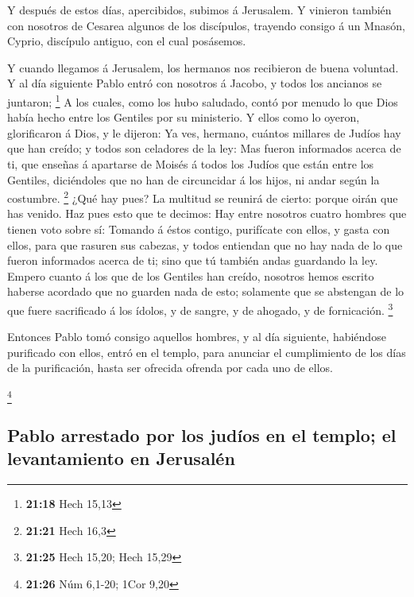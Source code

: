  Y después de estos días, apercibidos, subimos á Jerusalem.
 Y vinieron también con nosotros de Cesarea algunos de los
discípulos, trayendo consigo á un Mnasón, Cyprio, discípulo antiguo, con
el cual posásemos.

 Y cuando llegamos á Jerusalem, los hermanos nos recibieron
de buena voluntad.  Y al día siguiente Pablo entró con
nosotros á Jacobo, y todos los ancianos se juntaron; \footnote{\textbf{21:18}
  Hech 15,13}  A los cuales, como los hubo saludado, contó
por menudo lo que Dios había hecho entre los Gentiles por su ministerio.
 Y ellos como lo oyeron, glorificaron á Dios, y le dijeron:
Ya ves, hermano, cuántos millares de Judíos hay que han creído; y todos
son celadores de la ley:  Mas fueron informados acerca de
ti, que enseñas á apartarse de Moisés á todos los Judíos que están entre
los Gentiles, diciéndoles que no han de circuncidar á los hijos, ni
andar según la costumbre. \footnote{\textbf{21:21} Hech 16,3}
 ¿Qué hay pues? La multitud se reunirá de cierto: porque
oirán que has venido.  Haz pues esto que te decimos: Hay
entre nosotros cuatro hombres que tienen voto sobre sí: 
Tomando á éstos contigo, purifícate con ellos, y gasta con ellos, para
que rasuren sus cabezas, y todos entiendan que no hay nada de lo que
fueron informados acerca de ti; sino que tú también andas guardando la
ley.  Empero cuanto á los que de los Gentiles han creído,
nosotros hemos escrito haberse acordado que no guarden nada de esto;
solamente que se abstengan de lo que fuere sacrificado á los ídolos, y
de sangre, y de ahogado, y de fornicación. \footnote{\textbf{21:25} Hech
  15,20; Hech 15,29}

 Entonces Pablo tomó consigo aquellos hombres, y al día
siguiente, habiéndose purificado con ellos, entró en el templo, para
anunciar el cumplimiento de los días de la purificación, hasta ser
ofrecida ofrenda por cada uno de ellos.

\footnote{\textbf{21:26} Núm 6,1-20; 1Cor 9,20}

\hypertarget{pablo-arrestado-por-los-juduxedos-en-el-templo-el-levantamiento-en-jerusaluxe9n}{%
\subsection{Pablo arrestado por los judíos en el templo; el
levantamiento en
Jerusalén}\label{pablo-arrestado-por-los-juduxedos-en-el-templo-el-levantamiento-en-jerusaluxe9n}}


